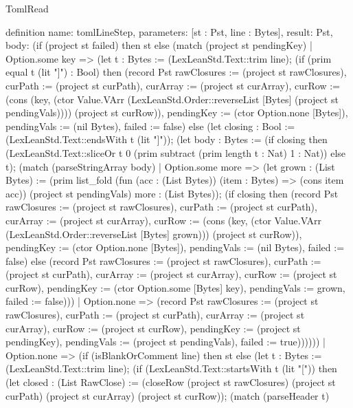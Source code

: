 \begin{lexlean}{TomlRead}
\begin{semanticmodule}
definition{
  name: tomlLineStep,
  parameters: [st : Pst, line : Bytes],
  result: Pst,
  body:
   (if (project st failed) then st
    else (match (project st pendingKey)
      | Option.some key =>
          (let t : Bytes := (LexLeanStd.Text::trim line);
           (if (prim equal t (lit "]") : Bool) then
              (record Pst {rawClosures := (project st rawClosures), curPath := (project st curPath), curArray := (project st curArray),
                curRow := (cons (key, (ctor Value.VArr (LexLeanStd.Order::reverseList [Bytes] (project st pendingVals)))) (project st curRow)),
                pendingKey := (ctor Option.none [Bytes]), pendingVals := (nil Bytes), failed := false})
            else (let closing : Bool := (LexLeanStd.Text::endsWith t (lit "]"));
              (let body : Bytes := (if closing then (LexLeanStd.Text::sliceOr t 0 (prim subtract (prim length t : Nat) 1 : Nat)) else t);
               (match (parseStringArray body)
                 | Option.some more =>
                     (let grown : (List Bytes) := (prim list_fold (fun (acc : (List Bytes)) (item : Bytes) => (cons item acc)) (project st pendingVals) more : (List Bytes));
                      (if closing then
                         (record Pst {rawClosures := (project st rawClosures), curPath := (project st curPath), curArray := (project st curArray),
                           curRow := (cons (key, (ctor Value.VArr (LexLeanStd.Order::reverseList [Bytes] grown))) (project st curRow)),
                           pendingKey := (ctor Option.none [Bytes]), pendingVals := (nil Bytes), failed := false})
                       else
                         (record Pst {rawClosures := (project st rawClosures), curPath := (project st curPath), curArray := (project st curArray),
                           curRow := (project st curRow), pendingKey := (ctor Option.some [Bytes] key), pendingVals := grown, failed := false})))
                 | Option.none => (record Pst {rawClosures := (project st rawClosures), curPath := (project st curPath), curArray := (project st curArray),
                     curRow := (project st curRow), pendingKey := (project st pendingKey), pendingVals := (project st pendingVals), failed := true}))))))
      | Option.none =>
          (if (isBlankOrComment line) then st
           else (let t : Bytes := (LexLeanStd.Text::trim line);
             (if (LexLeanStd.Text::startsWith t (lit "[")) then
                (let closed : (List RawClose) := (closeRow (project st rawClosures) (project st curPath) (project st curArray) (project st curRow));
                 (match (parseHeader t)
}
\end{semanticmodule}
\end{lexlean}
